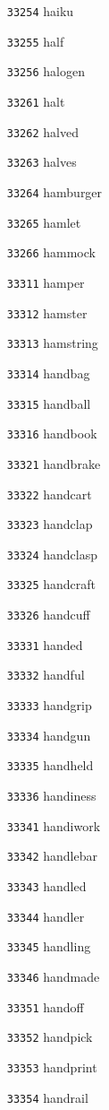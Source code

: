 \documentclass[twoside,11pt]{article}
\begin{document}
\begin{multicols}{5}
\begin{enumerate}
\item[\texttt{33254}] haiku
\item[\texttt{33255}] half
\item[\texttt{33256}] halogen
\item[\texttt{33261}] halt
\item[\texttt{33262}] halved
\item[\texttt{33263}] halves
\item[\texttt{33264}] hamburger
\item[\texttt{33265}] hamlet
\item[\texttt{33266}] hammock
\item[\texttt{33311}] hamper
\item[\texttt{33312}] hamster
\item[\texttt{33313}] hamstring
\item[\texttt{33314}] handbag
\item[\texttt{33315}] handball
\item[\texttt{33316}] handbook
\item[\texttt{33321}] handbrake
\item[\texttt{33322}] handcart
\item[\texttt{33323}] handclap
\item[\texttt{33324}] handclasp
\item[\texttt{33325}] handcraft
\item[\texttt{33326}] handcuff
\item[\texttt{33331}] handed
\item[\texttt{33332}] handful
\item[\texttt{33333}] handgrip
\item[\texttt{33334}] handgun
\item[\texttt{33335}] handheld
\item[\texttt{33336}] handiness
\item[\texttt{33341}] handiwork
\item[\texttt{33342}] handlebar
\item[\texttt{33343}] handled
\item[\texttt{33344}] handler
\item[\texttt{33345}] handling
\item[\texttt{33346}] handmade
\item[\texttt{33351}] handoff
\item[\texttt{33352}] handpick
\item[\texttt{33353}] handprint
\item[\texttt{33354}] handrail

\end{enumerate}
\end{multicols}
\end{document}
